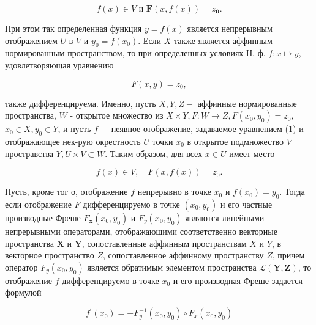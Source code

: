 \documentclass[10pt]{article}
\begin{document}
\[

f(x) \in V \text { и } \boldsymbol{F}(x, f(x))=z_{\mathbf{0}} .

\]



При этом так определенная функция $y=f(x)$ является непрерывным отображением $U$ в $V$ и $y_{0}=f\left(x_{0}\right)$. Если $X$ также является аффинным нормированным пространством, то при определенных условиях Н. ф. $f: x \mapsto y$, удовлетворяющая уравнению



\[

F(x, y)=z_{0},

\]



также дифференцируема. Именно, пусть $X, Y, Z-$ аффинные нормированные пространства, $W$ - открытое множество из $X \times Y, F: W \rightarrow Z, F\left(x_{0}, y_{0}\right)=z_{0}$, $x_{0} \in X, y_{0} \in Y$, и пусть $f-$ неявное отображение, задаваемое уравнением (1) и отображающее нек-рую окрестность $U$ точки $x_{0}$ в открытое подмножество $V$ простравства $Y, U \times V \subset W$. Таким образом, для всех $x \in U$ имеет место



\[

f(x) \in V, \quad F(x, f(x))=z_{0} .

\]



Пусть, кроме тог о, отображение $f$ непрерывно в точке $x_{0}$ и $f\left(x_{0}\right)=y_{0}$. Тогда если отображение $F$ дифференцируемо в точке $\left(x_{0}, y_{0}\right)$ и его частные производные Фреше $F_{\boldsymbol{x}}\left(x_{0}, y_{0}\right)$ и $F_{y}\left(x_{0}, y_{0}\right)$ являются линейными непрерывными операторами, отображающими соответственно векторные пространства $\boldsymbol{X}$ и $\boldsymbol{Y}$, сопоставленные аффинным пространствам $X$ и $Y$, в векторное пространство $Z$, сопоставленное аффинному пространству $Z$, причем оператор $F_{y}\left(x_{0}, y_{0}\right)$ является обратимым элементом пространства $\mathscr{L}(\boldsymbol{Y}, \boldsymbol{Z})$, то отображение $f$ дифференцируемо в точке $x_{0}$ и его производная Фреше задается формулой



\[

f^{\prime}\left(x_{0}\right)=-F_{y}^{-1}\left(x_{0}, y_{0}\right) \circ F_{x}\left(x_{0}, y_{0}\right)

\]
\end{document}
